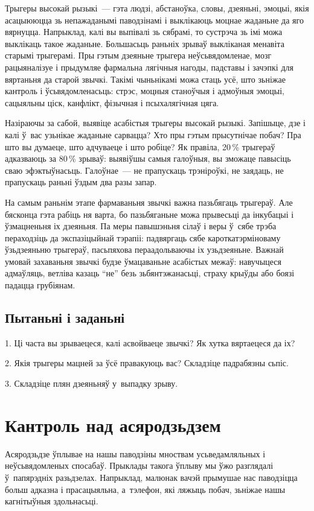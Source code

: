 Трыгеры высокай рызыкі~--- гэта людзі, абстаноўка, словы, дзеяньні, эмоцыі, якія асацыююцца зь непажаданымі паводзінамі і выклікаюць моцнае жаданьне да яго вярнуцца. Напрыклад, калі вы выпівалі зь сябрамі, то сустрэча зь імі можа выклікаць такое жаданьне. Большасьць раньніх зрываў выкліканая менавіта старымі трыгерамі. Пры гэтым дзеяньне трыгера неўсьвядомленае, мозг рацыяналізуе і прыдумляе фармальна лягічныя нагоды, падставы і зачэпкі для вяртаньня да старой звычкі. Такімі чыньнікамі можа стаць усё, што зьніжае кантроль і ўсьвядомленасьць: стрэс, моцныя станоўчыя і адмоўныя эмоцыі, сацыяльны ціск, канфлікт, фізычная і псыхалягічная цяга.

Назіраючы за сабой, выявіце асабістыя трыгеры высокай рызыкі. Запішыце, дзе і калі ў~вас узьнікае жаданьне сарвацца? Хто пры гэтым прысутнічае побач? Пра што вы думаеце, што адчуваеце і што робіце? Як правіла, 20\,\% трыгераў адказваюць за 80\,\% зрываў: выявіўшы самыя галоўныя, вы зможаце павысіць сваю эфэктыўнасьць. Галоўнае~--- не прапускаць трэніроўкі, не заядаць, не прапускаць раньні ўздым два разы запар.

На самым раньнім этапе фармаваньня звычкі важна пазьбягаць трыгераў. Але бясконца гэта рабіць ня варта, бо пазьбяганьне можа прывесьці да інкубацыі і ўзмацненьня іх дзеяньня. Па меры павышэньня сілаў і веры ў~сябе трэба пераходзіць да экспазіцыйнай тэрапіі: падвяргаць сябе кароткатэрміноваму ўзьдзеяньню трыгераў, пасьпяхова пераадольваючы іх узьдзеяньне. Важнай умовай захаваньня звычкі будзе ўмацаваньне асабістых межаў: навучыцеся адмаўляць, ветліва казаць ``не'' безь зьбянтэжанасьці, страху крыўды або боязі падацца грубіянам.

\subsection*{Пытаньні і заданьні}

1. Ці часта вы зрываецеся, калі асвойваеце звычкі? Як хутка вяртаецеся да іх?

2. Якія трыгеры мацней за ўсё правакуюць вас? Складзіце падрабязны сьпіс.

3. Складзіце плян дзеяньняў у~выпадку зрыву.


\section{Кантроль над асяродзьдзем}

Асяродзьдзе ўплывае на нашы паводзіны мноствам усьведамляльных і неўсьвядомленых спосабаў. Прыклады такога ўплыву мы ўжо разглядалі ў~папярэдніх разьдзелах. Напрыклад, малюнак вачэй прымушае нас паводзіцца больш адказна і прасацыяльна, а~тэлефон, які ляжыць побач, зьніжае нашы кагнітыўныя здольнасьці. 

